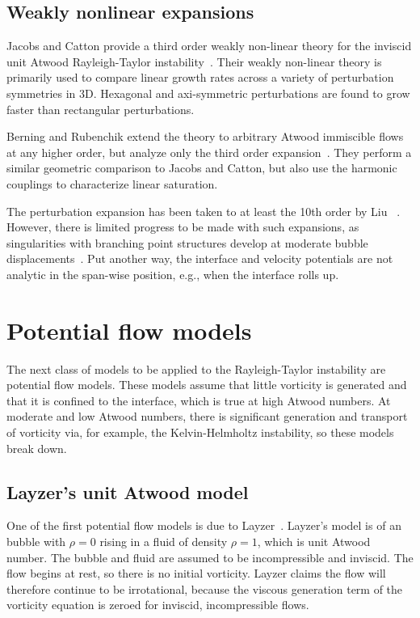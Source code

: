 \subsection{Weakly nonlinear expansions}
Jacobs and Catton provide a third order weakly non-linear theory for the inviscid unit Atwood Rayleigh-Taylor instability~\cite{Jacobs1988}.
Their weakly non-linear theory is primarily used to compare linear growth rates across a variety of perturbation symmetries in 3D.
Hexagonal and axi-symmetric perturbations are found to grow faster than rectangular perturbations.

Berning and Rubenchik extend the theory to arbitrary Atwood immiscible flows at any higher order, but analyze only the third order expansion~\cite{Berning1998}.
They perform a similar geometric comparison to Jacobs and Catton, but also use the harmonic couplings to characterize linear saturation.

The perturbation expansion has been taken to at least the 10th order by Liu \etal~\cite{Wang2010}.
However, there is limited progress to be made with such expansions, as singularities with branching point structures develop at moderate bubble displacements~\cite{Berning1998}.
Put another way, the interface and velocity potentials are not analytic in the span-wise position, e.g., when the interface rolls up.

\section{Potential flow models}

The next class of models to be applied to the Rayleigh-Taylor instability are potential flow models.
These models assume that little vorticity is generated and that it is confined to the interface, which is true at high Atwood numbers.
At moderate and low Atwood numbers, there is significant generation and transport of vorticity via, for example, the Kelvin-Helmholtz instability, so these models break down.

\subsection{Layzer's unit Atwood model}

One of the first potential flow models is due to Layzer~\cite{Layzer1955}.
Layzer's model is of an bubble with $\rho = 0$ rising in a fluid of density $\rho = 1$, which is unit Atwood number.
The bubble and fluid are assumed to be incompressible and inviscid.
The flow begins at rest, so there is no initial vorticity.
Layzer claims the flow will therefore continue to be irrotational, because the viscous generation term of the vorticity equation is zeroed for inviscid, incompressible flows.

